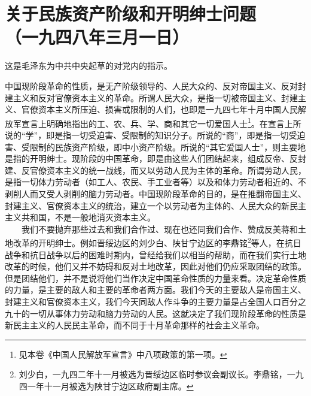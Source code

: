 \documentclass[cn,11pt,chinese]{elegantbook}
\def\myformat#1{\hfil\hfil #1}
\begin{document}
\newpage\section*{\myformat{关于民族资产阶级和开明绅士问题}\\\myformat{（一九四八年三月一日）}}
\begin{introduction}\item  这是毛泽东为中共中央起草的对党内的指示。\end{introduction}
中国现阶段革命的性质，是无产阶级领导的、人民大众的、反对帝国主义、反对封建主义和反对官僚资本主义的革命。所谓人民大众，是指一切被帝国主义、封建主义、官僚资本主义所压迫、损害或限制的人们，也即是一九四七年十月中国人民解放军宣言上明确地指出的工、农、兵、学、商和其它一切爱国人士\footnote[1]{ 见本卷《中国人民解放军宣言》中八项政策的第一项。}。在宣言上所说的“学”，即是指一切受迫害、受限制的知识分子。所说的“商”，即是指一切受迫害、受限制的民族资产阶级，即中小资产阶级。所说的“其它爱国人士”，则主要地是指的开明绅士。现阶段的中国革命，即是由这些人们团结起来，组成反帝、反封建、反官僚资本主义的统一战线，而又以劳动人民为主体的革命。所谓劳动人民，是指一切体力劳动者（如工人、农民、手工业者等）以及和体力劳动者相近的、不剥削人而又受人剥削的脑力劳动者。中国现阶段革命的目的，是在推翻帝国主义、封建主义、官僚资本主义的统治，建立一个以劳动者为主体的、人民大众的新民主主义共和国，不是一般地消灭资本主义。\\
　　我们不要抛弃那些过去和我们合作过、现在也还同我们合作、赞成反美蒋和土地改革的开明绅士。例如晋绥边区的刘少白、陕甘宁边区的李鼎铭\footnote[2]{ 刘少白，一九四二年十一月被选为晋绥边区临时参议会副议长。李鼎铭，一九四一年十一月被选为陕甘宁边区政府副主席。}等人，在抗日战争和抗日战争以后的困难时期内，曾经给我们以相当的帮助，而在我们实行土地改革的时候，他们又并不妨碍和反对土地改革，因此对他们仍应采取团结的政策。但是团结他们，并不是说将他们当作决定中国革命性质的力量来看。决定革命性质的力量，是主要的敌人和主要的革命者两方面。我们今天的主要敌人是帝国主义、封建主义和官僚资本主义，我们今天同敌人作斗争的主要力量是占全国人口百分之九十的一切从事体力劳动和脑力劳动的人民。这就决定了我们现阶段革命的性质是新民主主义的人民民主革命，而不同于十月革命那样的社会主义革命。\\
\end{document}

